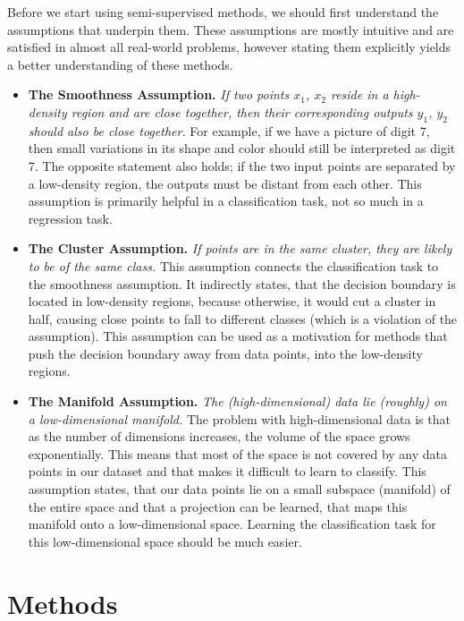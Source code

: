 Before we start using semi-supervised methods, we should first understand the assumptions that underpin them. These assumptions are mostly intuitive and are satisfied in almost all real-world problems, however stating them explicitly yields a better understanding of these methods.

\begin{itemize}
    \item \textbf{The Smoothness Assumption.} \emph{If two points $x_1$, $x_2$ reside in a high-density region and are close together, then their corresponding outputs $y_1$, $y_2$ should also be close together.} For example, if we have a picture of digit 7, then small variations in its shape and color should still be interpreted as digit 7. The opposite statement also holds; if the two input points are separated by a low-density region, the outputs must be distant from each other. This assumption is primarily helpful in a classification task, not so much in a regression task.
    \item  \textbf{The Cluster Assumption.} \emph{If points are in the same cluster, they are likely to be of the same class.} This assumption connects the classification task to the smoothness assumption. It indirectly states, that the decision boundary is located in low-density regions, because otherwise, it would cut a cluster in half, causing close points to fall to different classes (which is a violation of the assumption). This assumption can be used as a motivation for methods that push the decision boundary away from data points, into the low-density regions.
    \item \textbf{The Manifold Assumption.} \emph{The (high-dimensional) data lie (roughly) on a low-dimensional manifold.} The problem with high-dimensional data is that as the number of dimensions increases, the volume of the space grows exponentially. This means that most of the space is not covered by any data points in our dataset and that makes it difficult to learn to classify. This assumption states, that our data points lie on a small subspace (manifold) of the entire space and that a projection can be learned, that maps this manifold onto a low-dimensional space. Learning the classification task for this low-dimensional space should be much easier.
\end{itemize}


\section{Methods}
\label{sec:SslMethods}

